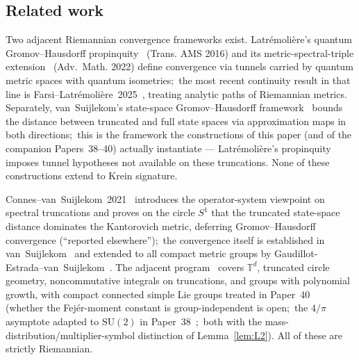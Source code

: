 \documentclass[11pt,a4paper]{article}
\theoremstyle{plain}
\theoremstyle{definition}
\newcommand{\Sone}{S^{1}}
\newcommand{\SU}{\mathrm{SU}}
\begin{document}
\subsection{Related work}\label{sec:related_work}

Two adjacent Riemannian convergence frameworks exist.
Latr\'emoli\`ere's quantum Gromov--Hausdorff
propinquity~\cite{latremoliere2018} (Trans. AMS 2016) and its
metric-spectral-triple extension~\cite{latremoliere_metric_st_2017}
(Adv.~Math. 2022) define convergence via tunnels carried by quantum
metric spaces with quantum isometries;\ the most recent continuity
result in that line is Farsi--Latr\'emoli\`ere~2025~\cite{farsi_latremoliere2025},
treating analytic paths of Riemannian metrics. Separately,
van~Suijlekom's state-space Gromov--Hausdorff
framework~\cite{vs2021_jgp} bounds the distance between truncated and
full state spaces via approximation maps in both directions;\ this is
the framework the constructions of this paper (and of the companion
Papers~38--40) actually instantiate — Latr\'emoli\`ere's propinquity
imposes tunnel hypotheses not available on these truncations. None of
these constructions extend to Krein signature.

Connes--van~Suijlekom~2021~\cite{connes_vs2021} introduces the
operator-system viewpoint on spectral truncations and proves on the
circle $\Sone$ that the truncated state-space distance dominates the
Kantorovich metric, deferring Gromov--Hausdorff convergence
(``reported elsewhere'');\ the convergence itself is established in
van~Suijlekom~\cite{vs2021_jgp} and extended to all compact metric
groups by Gaudillot-Estrada--van~Suijlekom~\cite{gaudillot_vs2023}.
The adjacent program~\cite{leimbach_vs2024,hekkelman2021,hekkelman_mcdonald2024b,toyota2023}
covers $\mathbb{T}^{d}$, truncated circle geometry, noncommutative
integrals on truncations, and groups with polynomial growth, with
compact connected simple Lie groups treated in
Paper~40~\cite{paper40_unified} (whether the Fej\'er-moment constant is
group-independent is open;\ the $4/\pi$ asymptote adapted to $\SU(2)$ in
Paper~38~\cite{paper38};\ both with the mass-distribution/multiplier-symbol
distinction of Lemma~\ref{lem:L2}). All of these are strictly Riemannian.
\end{document}
